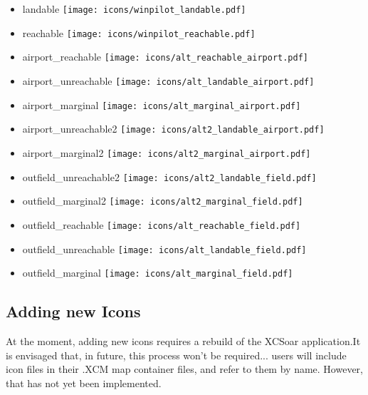 \begin{itemize}
\item landable \texttt{[image: icons/winpilot\_landable.pdf]}
\item reachable \texttt{[image: icons/winpilot\_reachable.pdf]}
\item airport\_reachable \texttt{[image: icons/alt\_reachable\_airport.pdf]}
\item airport\_unreachable \texttt{[image: icons/alt\_landable\_airport.pdf]}
\item airport\_marginal \texttt{[image: icons/alt\_marginal\_airport.pdf]}
\item airport\_unreachable2 \texttt{[image: icons/alt2\_landable\_airport.pdf]}
\item airport\_marginal2 \texttt{[image: icons/alt2\_marginal\_airport.pdf]}
\item outfield\_unreachable2 \texttt{[image: icons/alt2\_landable\_field.pdf]}
\item outfield\_marginal2 \texttt{[image: icons/alt2\_marginal\_field.pdf]}
\item outfield\_reachable \texttt{[image: icons/alt\_reachable\_field.pdf]}
\item outfield\_unreachable \texttt{[image: icons/alt\_landable\_field.pdf]}
\item outfield\_marginal \texttt{[image: icons/alt\_marginal\_field.pdf]}
\end{itemize}
\subsection{Adding new Icons}
At the moment, adding new icons requires a rebuild of the XCSoar application.It is envisaged that, in future, 
this process won't be required... users will include icon files in their .XCM map container files, and refer to them 
by name. However, that has not yet been implemented. 

